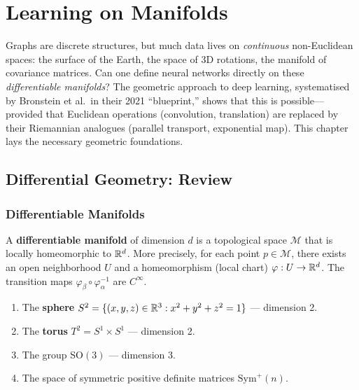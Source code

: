 \chapter{Learning on Manifolds}
\label{ch:manifolds}

Graphs are discrete structures, but much data lives on \emph{continuous} non-Euclidean spaces: the surface of the Earth, the space of 3D rotations, the manifold of covariance matrices. Can one define neural networks directly on these \emph{differentiable manifolds}? The geometric approach to deep learning, systematised by Bronstein et al.\ in their 2021 ``blueprint,'' shows that this is possible---provided that Euclidean operations (convolution, translation) are replaced by their Riemannian analogues (parallel transport, exponential map). This chapter lays the necessary geometric foundations.

\section{Differential Geometry: Review}

\subsection{Differentiable Manifolds}

\begin{definition}
A \textbf{differentiable manifold} of dimension $d$ is a topological space
$\mathcal{M}$ that is locally homeomorphic to $\mathbb{R}^d$. More precisely, for
each point $p \in \mathcal{M}$, there exists an open neighborhood $U$ and a
homeomorphism (local chart) $\varphi: U \to \mathbb{R}^d$. The transition maps
$\varphi_\beta \circ \varphi_\alpha^{-1}$ are $C^\infty$.
\end{definition}

\begin{example}
\begin{enumerate}
    \item The \textbf{sphere} $S^2 = \{(x,y,z) \in \mathbb{R}^3 : x^2 + y^2 + z^2 = 1\}$
          --- dimension 2.
    \item The \textbf{torus} $T^2 = S^1 \times S^1$ --- dimension 2.
    \item The group $\mathrm{SO}(3)$ --- dimension 3.
    \item The space of symmetric positive definite matrices $\mathrm{Sym}^+(n)$.
\end{enumerate}
\end{example}

